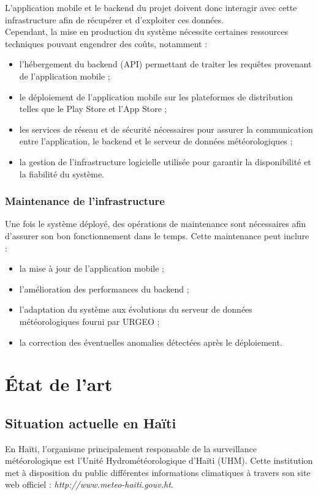 \noindent L’application mobile et le backend du projet doivent donc interagir avec cette infrastructure afin de récupérer et d’exploiter ces données.\\

\noident Cependant, la mise en production du système nécessite certaines ressources techniques pouvant engendrer des coûts, notamment :


\begin{itemize}
\item l’hébergement du backend (API) permettant de traiter les requêtes provenant de l’application mobile ;
\item le déploiement de l’application mobile sur les plateformes de distribution telles que le Play Store et l’App Store ;
\item les services de réseau et de sécurité nécessaires pour assurer la communication entre l’application, le backend et le serveur de données météorologiques ;
\item la gestion de l’infrastructure logicielle utilisée pour garantir la disponibilité et la fiabilité du système.
\end{itemize}


\subsubsection{Maintenance de l’infrastructure}

Une fois le système déployé, des opérations de maintenance sont nécessaires afin d’assurer son bon fonctionnement dans le temps. Cette maintenance peut inclure :

\begin{itemize}
\item la mise à jour de l’application mobile ;
\item l’amélioration des performances du backend ;
\item l’adaptation du système aux évolutions du serveur de données météorologiques fourni par URGEO ;
\item la correction des éventuelles anomalies détectées après le déploiement.
\end{itemize}


 \section{État de l’art}

 \subsection{ Situation actuelle en Haïti}
 En Haïti, l’organisme principalement responsable de la surveillance météorologique est l’Unité Hydrométéorologique d’Haïti (UHM). Cette institution met à disposition du public différentes informations climatiques à travers son site web officiel : \textit{http://www.meteo-haiti.gouv.ht}.

